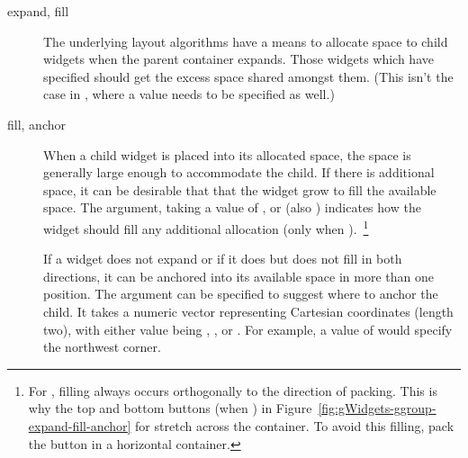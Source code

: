 \begin{description}
\item[expand, fill] The underlying layout algorithms have a means to
  allocate space to child widgets when the parent container
  expands. Those widgets which have 
  specified should get the excess space shared amongst
  them. (This isn't the case in , where a 
    value needs to be specified as well.)
 

\item[fill, anchor] When a child widget is placed into its allocated
  space, the space is generally large enough to accommodate the
  child. If there is additional space, it can be desirable that that
  the widget grow to fill the available space.  The 
  argument, taking a value of ,  or  (also
  ) indicates how the widget should fill any additional
  allocation (only when ).~\footnote{For \GTK,
    filling always occurs orthogonally to the direction of
    packing. This is why the top and bottom buttons (when
    ) in
    Figure~\ref{fig:gWidgets-ggroup-expand-fill-anchor} for
     stretch across the container. To avoid this
    filling, pack the button in a horizontal  container.}
 
  If a widget does not expand or if it does but does not fill in both
  directions, it can be anchored into its available space in more than
  one position. The  argument can be specified to suggest
  where to anchor the child. It takes a numeric vector representing
  Cartesian coordinates (length two),
  with either value being , , or . For
  example, a value of  would specify the northwest corner.
\end{description}

